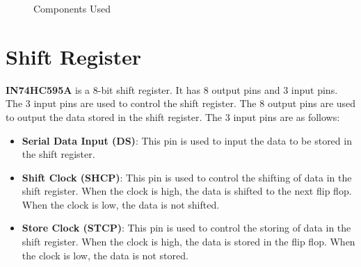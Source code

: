 \documentclass[12pt, a4paper, oneside]{report}
\begin{document}
\begin{figure}[H]
    \centering
    \hfill
    \hfill
    \hfill
    \par 
    \caption{Components Used}
    \label{fig: components}
\end{figure}

\section{Shift Register}

\textbf{IN74HC595A} is a 8-bit shift register. It has 8 output pins and 3 input pins. The 3 input pins are used to control the shift register. The 8 output pins are used to output the data stored in the shift register. The 3 input pins are as follows:
\begin{itemize}
    \item \textbf{Serial Data Input (DS)}: This pin is used to input the data to be stored in the shift register.
    \item \textbf{Shift Clock (SHCP)}: This pin is used to control the shifting of data in the shift register. When the clock is high, the data is shifted to the next flip flop. When the clock is low, the data is not shifted.
    \item \textbf{Store Clock (STCP)}: This pin is used to control the storing of data in the shift register. When the clock is high, the data is stored in the flip flop. When the clock is low, the data is not stored.
\end{itemize}
\end{document}
